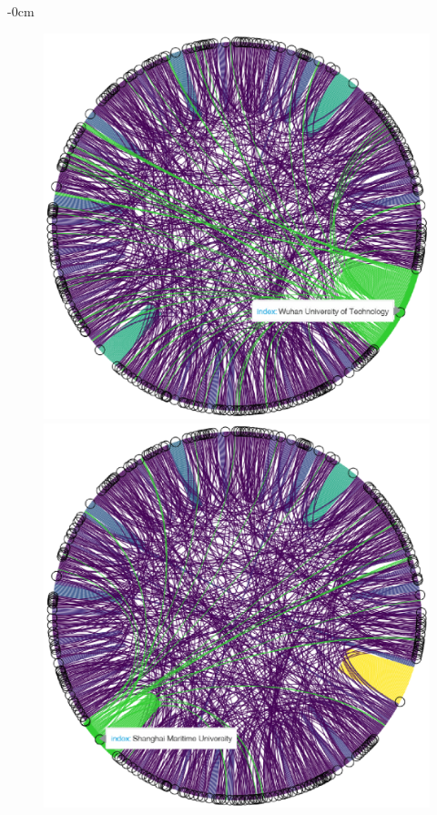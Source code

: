 \documentclass[jmse,review,submit,pdftex,moreauthors]{Definitions/mdpi}
\begin{document}
\begin{adjustwidth}{-\extralength}{0cm}
\begin{figure}[H]
	\centering
	\includegraphics[height=0.3\textheight, keepaspectratio]{pics/coauthorship_inst_chord_1.eps}
	\includegraphics[height=0.3\textheight, keepaspectratio]{pics/coauthorship_inst_chord_2.eps}

\end{figure}
\end{adjustwidth}
\end{document}
